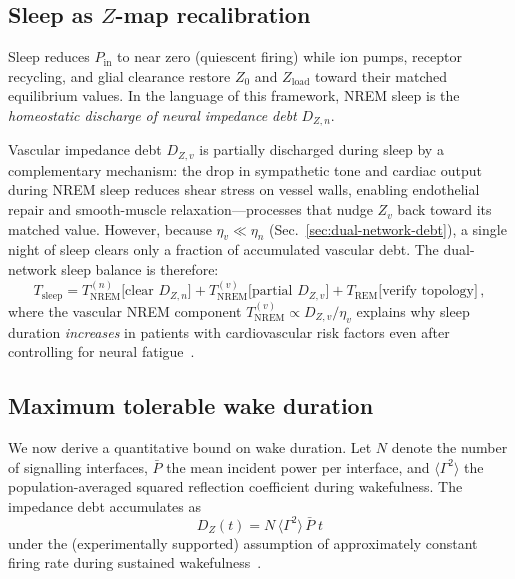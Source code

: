 ﻿\documentclass[aps,pre,twocolumn,superscriptaddress,floatfix]{revtex4-2}
\begin{document}
\subsection{Sleep as $Z$-map recalibration}

Sleep reduces $P_{\mathrm{in}}$ to near zero (quiescent firing)
while ion pumps, receptor recycling, and glial clearance
restore $Z_0$ and $Z_{\mathrm{load}}$ toward their
matched equilibrium values.
In the language of this framework, NREM sleep is the
\emph{homeostatic discharge of neural impedance debt} $D_{Z,n}$.

Vascular impedance debt $D_{Z,v}$ is partially discharged
during sleep by a complementary mechanism: the drop in
sympathetic tone and cardiac output during NREM sleep
reduces shear stress on vessel walls, enabling endothelial
repair and smooth-muscle relaxation---processes that nudge
$Z_v$ back toward its matched value.
However, because $\eta_v \ll \eta_n$ (Sec.~\ref{sec:dual-network-debt}),
a single night of sleep clears only a fraction of accumulated
vascular debt.
The dual-network sleep balance is therefore:
\begin{equation}
  T_{\mathrm{sleep}} =
    T_{\mathrm{NREM}}^{(n)}\!\bigl[\text{clear } D_{Z,n}\bigr]
  + T_{\mathrm{NREM}}^{(v)}\!\bigl[\text{partial } D_{Z,v}\bigr]
  + T_{\mathrm{REM}}\!\bigl[\text{verify topology}\bigr]\,,
  \label{eq:Tsleep-dual}
\end{equation}
where the vascular NREM component
$T_{\mathrm{NREM}}^{(v)} \propto D_{Z,v}/\eta_v$
explains why sleep duration \emph{increases} in patients with
cardiovascular risk factors even after controlling for
neural fatigue~\cite{PaperII}.


\subsection{Maximum tolerable wake duration}

We now derive a quantitative bound on wake duration.
Let $N$ denote the number of signalling interfaces,
$\bar{P}$ the mean incident power per interface,
and $\langle\Gamma^2\rangle$ the population-averaged
squared reflection coefficient during wakefulness.
The impedance debt accumulates as
\begin{equation}
  D_Z(t) = N\,\langle\Gamma^2\rangle\,\bar{P}\; t
  \label{eq:DZ-linear}
\end{equation}
under the (experimentally supported) assumption of
approximately constant firing rate during sustained
wakefulness~\cite{Karbowski2009}.
\end{document}
